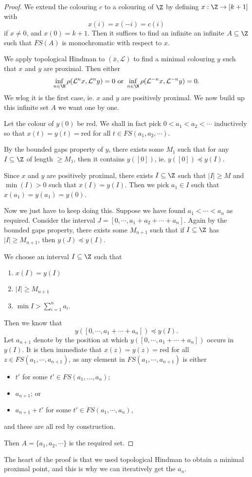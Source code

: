 \documentclass[a4paper]{article}
\begin{document}
\begin{proof}
  We extend the colouring $c$ to a colouring of $\Z$ by defining $x: \Z \to [k + 1]$ with
  \[
    x(i) = x(-i) = c(i)
  \]
  if $x\not= 0$, and $x(0) = k + 1$. Then it suffices to find an infinite an infinite $A \subseteq \Z$ such that $FS(A)$ is monochromatic with respect to $x$.

  We apply topological Hindman to $(\bar{x}, \mathcal{L})$ to find a minimal colouring $y$ such that $x$ and $y$ are proximal. Then either
  \[
    \inf_{n \in \N} \rho(\mathcal{L}^n x, \mathcal{L}^n y) = 0\text{ or } \inf_{n \in \N} \rho(\mathcal{L}^{-n} x, \mathcal{L}^{-n} y) = 0.
  \]
  We wlog it is the first case, ie. $x$ and $y$ are positively proximal. We now build up this infinite set $A$ we want one by one.

  Let the colour of $y(0)$ be red. We shall in fact pick $0 < a_1 < a_2 < \cdots$ inductively so that $x(t) = y(t) = \text{red}$ for all $t \in FS(a_1, a_2, \cdots)$.

  By the bounded gaps property of $y$, there exists some $M_1$ such that for any $I \subseteq \Z$ of length $\geq M_1$, then it contains $y([0])$, ie. $y([0]) \preccurlyeq y(I)$.

  Since $x$ and $y$ are positively proximal, there exists $I \subseteq \Z$ such that $|I| \geq M$ and $\min(I) > 0$ such that $x(I) = y(I)$. Then we pick $a_1 \in I$ such that $x(a_1) = y(a_1) = y(0)$.

  Now we just have to keep doing this. Suppose we have found $a_1 < \cdots < a_n$ as required. Consider the interval $J = [0, \cdots, a_1 + a_2 + \cdots + a_n]$. Again by the bounded gaps property, there exists some $M_{n + 1}$ such that if $I \subseteq \Z$ has $|I| \geq M_{n + 1}$, then $y(J) \preccurlyeq y(I)$.

  We choose an interval $I \subseteq \Z$ such that
  \begin{enumerate}
    \item $x(I) = y(I)$
    \item $|I| \geq M_{n + 1}$
    \item $\min I > \sum_{i = 1}^n a_i$.
  \end{enumerate}
  Then we know that
  \[
    y([0, \cdots, a_1 + \cdots + a_n]) \preccurlyeq y(I).
  \]
  Let $a_{n + 1}$ denote by the position at which $y([0, \cdots, a_1 + \cdots + a_n])$ occurs in $y(I)$. It is then immediate that $x(z) = y(z) = \mathrm{red}$ for all $z \in FS(a_1, \cdots, a_{n + 1})$, as any element in $FS(a_1, \cdots, a_{n + 1})$ is either
  \begin{itemize}
    \item $t'$ for some $t' \in FS(a_1, \ldots, a_n)$;
    \item $a_{n + 1}$; or
    \item $a_{n + 1} + t'$ for some $t' \in FS(a_1, \cdots, a_n)$,
  \end{itemize}
  and these are all red by construction.

  Then $A = \{a_1, a_2, \cdots\}$ is the required set.
\end{proof}
The heart of the proof is that we used topological Hindman to obtain a minimal proximal point, and this is why we can iteratively get the $a_n$.
\end{document}
